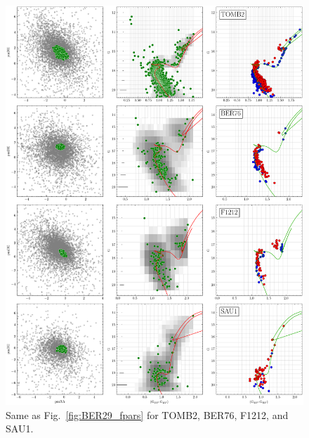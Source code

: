 \documentclass[draft]{aa}
\begin{document}
\begin{appendix}
 \begin{figure}
  \centering
  \includegraphics[height=.95\textheight]{figs/4_fpars.png}
  \caption{Same as Fig.~\ref{fig:BER29_fpars} for TOMB2, BER76, F1212, and SAU1.}
  \label{fig:4fpars}
 \end{figure}


\end{appendix}
\end{document}
